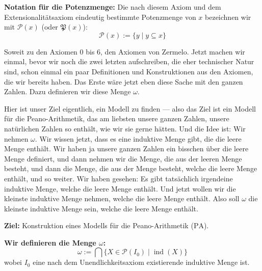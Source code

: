 \begin{math-stroke}[Potenzmengenaxiom]
\begin{axioms}
\end{axioms}

\textbf{Notation für die Potenzmenge:}
Die nach diesem Axiom und dem Extensionalitätsaxiom eindeutig bestimmte Potenzmenge von $x$ bezeichnen wir mit $\mathcal{P}(x)$ (oder $\mathfrak{P}(x)$):
\[
\mathcal{P}(x) := \{ y \mid y \subseteq x \}
\]
\end{math-stroke}

\begin{spoken-clean}[00:43:31 - 00:45:01]
Soweit zu den Axiomen 0 bis 6, den Axiomen von Zermelo. Jetzt machen wir einmal, bevor wir noch die zwei letzten aufschreiben, die eher technischer Natur sind, schon einmal ein paar Definitionen und Konstruktionen aus den Axiomen, die wir bereits haben. Das Erste wäre jetzt eben diese Sache mit den ganzen Zahlen. Dazu definieren wir diese Menge $\omega$.
\end{spoken-clean}

\begin{spoken-clean}[00:45:01 - 00:46:16]
Hier ist unser Ziel eigentlich, ein Modell zu finden --- also das Ziel ist ein Modell für die Peano-Arithmetik, das am liebsten unsere ganzen Zahlen, unsere natürlichen Zahlen so enthält, wie wir sie gerne hätten. Und die Idee ist: Wir nehmen $\omega$. Wir wissen jetzt, dass es eine induktive Menge gibt, die die leere Menge enthält. Wir haben ja unsere ganzen Zahlen ein bisschen über die leere Menge definiert, und dann nehmen wir die Menge, die aus der leeren Menge besteht, und dann die Menge, die aus der Menge besteht, welche die leere Menge enthält, und so weiter. Wir haben gesehen: Es gibt tatsächlich irgendeine induktive Menge, welche die leere Menge enthält. Und jetzt wollen wir die kleinste induktive Menge nehmen, welche die leere Menge enthält. Also soll $\omega$ die kleinste induktive Menge sein, welche die leere Menge enthält.
\end{spoken-clean}

\begin{math-stroke}
\textbf{Ziel:} Konstruktion eines Modells für die Peano-Arithmetik ($\text{PA}$).

\textbf{Wir definieren die Menge $\omega$:}
\[
\omega := \bigcap \{ X \in \mathcal{P}(I_0) \mid \operatorname{ind}(X) \}
\]
wobei $I_0$ eine nach dem Unendlichkeitsaxiom existierende induktive Menge ist.
\end{math-stroke}

